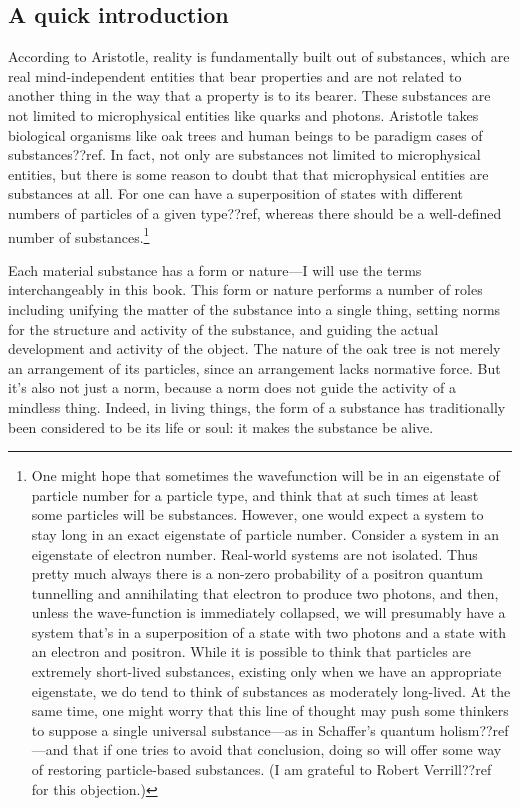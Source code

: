 \subsection{A quick introduction}
According to Aristotle, reality is fundamentally built out of substances, which are real mind-independent entities that
bear properties and are not related to another thing in the way that a property is to its bearer.
These substances are not limited to microphysical entities like quarks and photons. Aristotle takes biological organisms 
like oak trees and human beings to be paradigm cases of substances??ref. In fact, not only are substances not limited to 
microphysical entities, but there is some reason to doubt that that microphysical entities are substances at all. For 
one can have a superposition of states with different numbers of particles of a given type??ref, whereas there should be a well-defined 
number of substances.\footnote{One might hope that sometimes the wavefunction will be in an eigenstate of particle
number for a particle type, and think that at such times at least some particles will be substances. However, one would expect a system
to stay long in an exact eigenstate of particle number. Consider a system in an eigenstate of electron number. Real-world
systems are not isolated. Thus pretty much always there is a non-zero probability of a positron quantum tunnelling and annihilating
that electron to produce two photons, and then, unless the wave-function is immediately collapsed, we will presumably have 
a system that's in a superposition of a state with two photons and a state with an electron and positron. While it is possible
to think that particles are extremely short-lived substances, existing only when we have an appropriate eigenstate, we do tend
to think of substances as moderately long-lived. At the same time, one might worry that this line of thought may push some 
thinkers to suppose a single universal substance---as in Schaffer's quantum holism??ref---and that if one tries to avoid
that conclusion, doing so will offer some way of restoring particle-based substances. (I am grateful to Robert Verrill??ref for
this objection.)}

Each material substance has a form or nature---I will use the terms interchangeably in this book. This form or nature performs a number of roles including unifying the matter of the 
substance into a single thing, setting norms for the structure and activity of the substance, and guiding the actual 
development and activity of the object. The nature of the oak tree is not merely an arrangement of its particles, since an
arrangement lacks normative force. But it's also not just a norm, because a norm does not guide the activity of a mindless
thing. Indeed, in living things, the form of a substance has traditionally been considered to be its life or soul: it makes the substance
be alive. 

